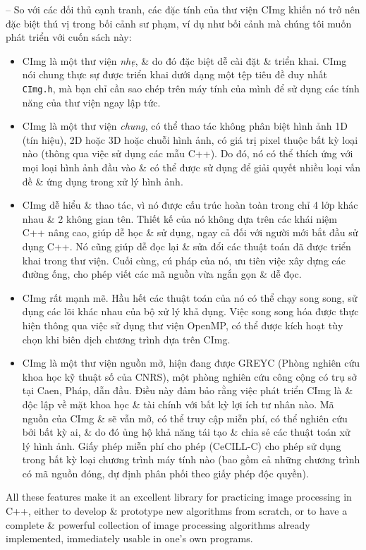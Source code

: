 \documentclass{article}
\begin{document}
\begin{itemize}
\begin{itemize}
\begin{itemize}
        \end{itemize}
        -- So với các đối thủ cạnh tranh, các đặc tính của thư viện CImg khiến nó trở nên đặc biệt thú vị trong bối cảnh sư phạm, ví dụ như bối cảnh mà chúng tôi muốn phát triển với cuốn sách này:
        \begin{itemize}
            \item CImg là một thư viện {\it nhẹ}, \& do đó đặc biệt dễ cài đặt \& triển khai. CImg nói chung thực sự được triển khai dưới dạng một tệp tiêu đề duy nhất {\tt CImg.h}, mà bạn chỉ cần sao chép trên máy tính của mình để sử dụng các tính năng của thư viện ngay lập tức.
            \item CImg là một thư viện {\it chung}, có thể thao tác không phân biệt hình ảnh 1D (tín hiệu), 2D hoặc 3D hoặc chuỗi hình ảnh, có giá trị pixel thuộc bất kỳ loại nào (thông qua việc sử dụng các mẫu C++). Do đó, nó có thể thích ứng với mọi loại hình ảnh đầu vào \& có thể được sử dụng để giải quyết nhiều loại vấn đề \& ứng dụng trong xử lý hình ảnh.
            \item CImg dễ hiểu \& thao tác, vì nó được cấu trúc hoàn toàn trong chỉ 4 lớp khác nhau \& 2 không gian tên. Thiết kế của nó không dựa trên các khái niệm C++ nâng cao, giúp dễ học \& sử dụng, ngay cả đối với người mới bắt đầu sử dụng C++. Nó cũng giúp dễ đọc lại \& sửa đổi các thuật toán đã được triển khai trong thư viện. Cuối cùng, cú pháp của nó, ưu tiên việc xây dựng các đường ống, cho phép viết các mã nguồn vừa ngắn gọn \& dễ đọc.
            \item CImg rất mạnh mẽ. Hầu hết các thuật toán của nó có thể chạy song song, sử dụng các lõi khác nhau của bộ xử lý khả dụng. Việc song song hóa được thực hiện thông qua việc sử dụng thư viện OpenMP, có thể được kích hoạt tùy chọn khi biên dịch chương trình dựa trên CImg.
            \item CImg là một thư viện nguồn mở, hiện đang được GREYC (Phòng nghiên cứu khoa học kỹ thuật số của CNRS), một phòng nghiên cứu công cộng có trụ sở tại Caen, Pháp, dẫn đầu. Điều này đảm bảo rằng việc phát triển CImg là \& độc lập về mặt khoa học \& tài chính với bất kỳ lợi ích tư nhân nào. Mã nguồn của CImg \& sẽ vẫn mở, có thể truy cập miễn phí, có thể nghiên cứu bởi bất kỳ ai, \& do đó ủng hộ khả năng tái tạo \& chia sẻ các thuật toán xử lý hình ảnh. Giấy phép miễn phí cho phép (CeCILL-C) cho phép sử dụng trong bất kỳ loại chương trình máy tính nào (bao gồm cả những chương trình có mã nguồn đóng, dự định phân phối theo giấy phép độc quyền).
        \end{itemize}
        All these features make it an excellent library for practicing image processing in C++, either to develop \& prototype new algorithms from scratch, or to have a complete \& powerful collection of image processing algorithms already implemented, immediately usable in one's own programs.
        

\end{itemize}
\end{itemize}
\end{document}
